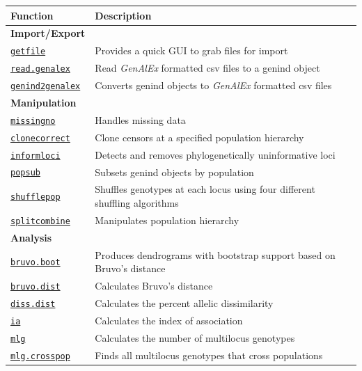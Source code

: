 \documentclass[letterpaper]{article}\usepackage[]{graphicx}\usepackage[]{color}
\begin{document}
\begin{table}[ht]
\centering
\begin{tabular}{ll}
\textbf{\large Function} & \textbf{\large Description} \\ 
\hline
\textbf{Import/Export} & \\
\texttt{\hyperref[intro:import:getfile]{getfile}} & Provides a quick GUI to grab files for import \\
\texttt{\hyperref[intro:import:read.genalex]{read.genalex}} & Read \textit{GenAlEx} formatted csv files to a genind object \\
\texttt{\hyperref[intro:import:genind2genalex]{genind2genalex}} & Converts genind objects to \textit{GenAlEx} formatted csv files \\
\hline
\textbf{Manipulation} & \\
\texttt{\hyperref[data.manip:missing:missingno]{missingno}} & Handles missing data \\
\texttt{\hyperref[data.manip:cc:clonecorrect]{clonecorrect}} & Clone censors at a specified population hierarchy \\
\texttt{\hyperref[data.manip:informloci]{informloci}} & Detects and removes phylogenetically uninformative loci \\
\texttt{\hyperref[data.manip:divide:popsub]{popsub}} & Subsets genind objects by population \\
\texttt{\hyperref[data.manip:shuffle:shufflepop]{shufflepop}} & Shuffles genotypes at each locus using four different shuffling algorithms \\
\texttt{\hyperref[data.manip:hier:splitcombine]{splitcombine}} & Manipulates population hierarchy \\ 
\hline
\textbf{Analysis} & \\
\texttt{\hyperref[index:trees:bruvo.boot]{bruvo.boot}} & Produces dendrograms with bootstrap support based on Bruvo's distance \\
\texttt{\hyperref[index:bruvo:bruvo.dist]{bruvo.dist}} & Calculates Bruvo's distance \\
\texttt{\hyperref[index:dist:diss.dist]{diss.dist}} & Calculates the percent allelic dissimilarity \\
\texttt{\hyperref[index:iard:ia]{ia}} & Calculates the index of association \\
\texttt{\hyperref[mlg:mlg:mlg]{mlg}} & Calculates the number of multilocus genotypes \\
\texttt{\hyperref[mlg:cross:mlg.crosspop]{mlg.crosspop}} & Finds all multilocus genotypes that cross populations \\

\end{tabular}
\end{table}
\end{document}
